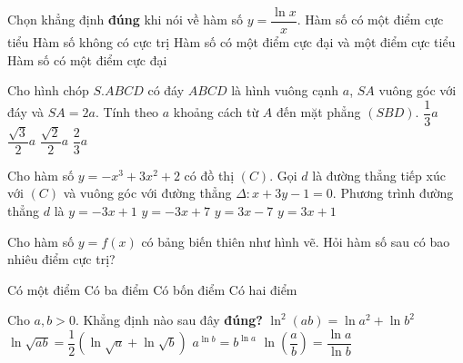\begin{ex}%
	Chọn khẳng định \textbf{đúng} khi nói về hàm số $y=\dfrac{\ln x}{x}$.
	\choice
	{Hàm số có một điểm cực tiểu}
	{Hàm số không có cực trị}
	{Hàm số có một điểm cực đại và một điểm cực tiểu}
	{\True Hàm số có một điểm cực đại}
\end{ex}

\begin{ex}%
	Cho hình chóp $S.ABCD$ có đáy $ABCD$ là hình vuông cạnh $a$, $SA$ vuông góc với đáy và $SA=2a$. Tính theo $a$ khoảng cách từ $A$ đến mặt phẳng $(SBD)$.
	\choice
	{$\dfrac{1}{3}a$}
	{$\dfrac{\sqrt{3}}{2}a$}
	{$\dfrac{\sqrt{2}}{2}a$}
	{\True $\dfrac{2}{3}a$}
\end{ex}

\begin{ex}%
	Cho hàm số $y=-x^3+3x^2+2$ có đồ thị $(C)$. Gọi $d$ là đường thẳng tiếp xúc với $(C)$ và vuông góc với đường thẳng $\Delta:x+3y-1=0$. Phương trình đường thẳng $d$ là
	\choice
	{$y=-3x+1$}
	{$y=-3x+7$}
	{$y=3x-7$}
	{\True $y=3x+1$}
\end{ex}

\begin{ex}%
	Cho hàm số $y=f(x)$ có bảng biến thiên như hình vẽ. Hỏi hàm số sau có bao nhiêu điểm cực trị?
	\begin{center}
	\end{center}
	\choice
	{Có một điểm}
	{Có ba điểm}
	{Có bốn điểm}
	{\True Có hai điểm}
\end{ex}

\begin{ex}%
	Cho $a,b>0$. Khẳng định nào sau đây \textbf{đúng?}
	\choice
	{$\ln^2(ab)=\ln a^2+\ln b^2$}
	{$\ln \sqrt{ab}=\dfrac{1}{2}\left( \ln \sqrt{a}+\ln \sqrt{b} \right)$}
	{\True $a^{\ln b}=b^{\ln a}$}
	{$\ln \left( \dfrac{a}{b} \right)=\dfrac{\ln a}{\ln b}$}
\end{ex}

